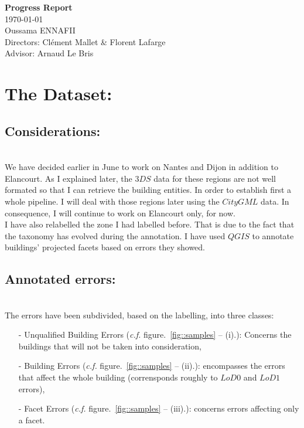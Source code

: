 \documentclass[a4paper, 11pt]{article}
\begin{document}
	\begin{centering}
		\Large{\textbf{Progress Report}}\\
		\large{\today}
~\\
		Oussama ENNAFII\\
		Directors: Cl\'ement Mallet \& Florent Lafarge \\
		Advisor: Arnaud Le Bris \\

	\end{centering}


	\section{The Dataset:}
	\subsection{Considerations:}
~\\

	We have decided earlier in June to work on Nantes and Dijon in addition to
	Elancourt. As I explained later, the $3DS$ data for these regions are not
	well formated so that I can retrieve the building entities. In order to
	establish first a whole pipeline. I will deal with those regions later using
	the $CityGML$ data. In consequence, I will continue to work on Elancourt
	only, for now.\\

	I have also relabelled the zone I had labelled before. That is due to the fact
	that the taxonomy has evolved during the annotation. I have used $QGIS$ to
	annotate buildings' projected facets based on errors they showed.\\

	\subsection{Annotated errors:}
~\\


	The errors have been subdivided, based on the labelling, into three classes:

	\begin{itemize}
		\item[-] Unqualified Building Errors (\textit{c.f.} figure.~\ref{fig::samples} -- (i).): Concerns the buildings that will not
		be taken into consideration,
		\item[-] Building Errors (\textit{c.f.} figure.~\ref{fig::samples} -- (ii).):
		encompasses the errors that affect the whole building (corrensponds roughly to $LoD0$ and $LoD1$ errors),
		\item[-] Facet Errors (\textit{c.f.} figure.~\ref{fig::samples} -- (iii).):
		concerns errors affecting only a facet.
	\end{itemize}
\end{document}
